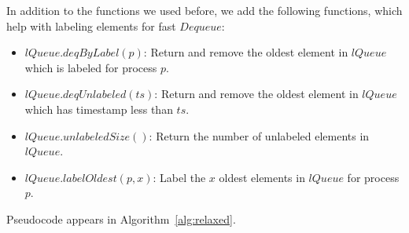 \documentclass[a4paper,anonymous,USenglish]{lipics-v2021} %
\theoremstyle{definition}
\begin{document}
In addition to the functions we used before, we add the following functions, which help with labeling elements for fast $Dequeue$:
\begin{itemize}
\item $lQueue.deqByLabel(p)$: Return and remove the oldest element in $lQueue$ which is labeled for process $p$.
\item $lQueue.deqUnlabeled(ts)$: Return and remove the oldest element in $lQueue$ which has timestamp less than $ts$.
\item $lQueue.unlabeledSize()$: Return the number of unlabeled elements in $lQueue$.
\item $lQueue.labelOldest(p,x)$: Label the $x$ oldest elements in $lQueue$ for process $p$.
\end{itemize}
  Pseudocode appears in Algorithm~\ref{alg:relaxed}.
\end{document}
